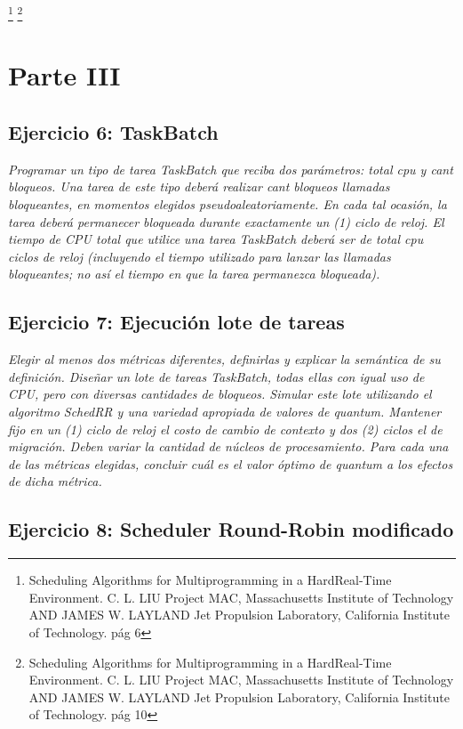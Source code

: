 \documentclass[a4paper]{article}
\begin{document}
\footnote[1]{Scheduling Algorithms for Multiprogramming in a HardReal-Time Environment.
C. L. LIU Project MAC, Massachusetts Institute of Technology AND JAMES W. LAYLAND Jet Propulsion Laboratory, California Institute of Technology. pág 6}\newline
\footnote[2]{Scheduling Algorithms for Multiprogramming in a HardReal-Time Environment.
C. L. LIU Project MAC, Massachusetts Institute of Technology AND JAMES W. LAYLAND Jet Propulsion Laboratory, California Institute of Technology. pág 10}





\newpage
\section{Parte III}


 \subsection{Ejercicio 6: TaskBatch}
\textit{Programar un tipo de tarea TaskBatch que reciba dos par\'ametros: total cpu y cant bloqueos. Una tarea de este tipo deber\'a realizar cant bloqueos llamadas bloqueantes, en momentos elegidos pseudoaleatoriamente. En cada tal ocasi\'on, la tarea deber\'a permanecer bloqueada durante exactamente un (1) ciclo de reloj. El tiempo de CPU total que utilice una tarea TaskBatch deber\'a ser de total cpu ciclos de reloj (incluyendo el tiempo utilizado para lanzar las llamadas bloqueantes; no as\'i el tiempo en que la tarea permanezca bloqueada).}

 \subsection{Ejercicio 7: Ejecuci\'on lote de tareas}
\textit{Elegir al menos dos m\'etricas diferentes, definirlas y explicar la sem\'antica de su definici\'on. Dise\~nar un lote de tareas TaskBatch, todas ellas con igual uso de CPU, pero con diversas cantidades de bloqueos. Simular este lote utilizando el algoritmo SchedRR y una variedad apropiada de valores de quantum. Mantener fijo en un (1) ciclo de reloj el costo de cambio de contexto y dos (2) ciclos el de migraci\'on. Deben variar la cantidad de n\'ucleos de procesamiento. Para cada una de las m\'etricas elegidas, concluir cu\'al es el valor \'optimo de quantum a los efectos de dicha m\'etrica.}

\newpage
 \subsection{Ejercicio 8: Scheduler Round-Robin modificado}
 
\end{document}
